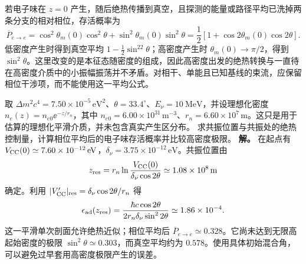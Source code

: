 若电子味在 $z=0$ 产生，随后绝热传播到真空，且探测的能量或路径平均已洗掉两条分支的相对相位，存活概率为
\begin{equation}
 \overline P_{e\to e}
 =\cos^2\theta_m(0)\cos^2\theta+\sin^2\theta_m(0)\sin^2\theta
 =\frac12[1+\cos2\theta_m(0)\cos2\theta].
 \label{eq:sm-matter-averaged-survival}
\end{equation}
低密度产生时得到真空平均 $1-\tfrac12\sin^22\theta$；高密度产生时 $\theta_m(0)\to\pi/2$，得到 $\sin^2\theta$。这里改变的是本征态随密度的组成，因此高密度出发的绝热转换与一直待在高密度介质中的小振幅振荡并不矛盾。对相干、单能且已知基线的束流，应保留相位干涉项，而不能使用这一平均公式。

\begin{exbox}[指数剖面的绝热性检查]
取 $\Delta m^2c^4=7.50\times10^{-5}\,\mathrm{eV^2}$、$\theta=33.4^\circ$、$E_\nu=\SI{10}{\mega\electronvolt}$，并设理想化密度 $n_e(z)=n_{e0}\ee^{-z/r_n}$，其中 $n_{e0}=6.00\times10^{31}\,\mathrm{m^{-3}}$、$r_n=6.60\times10^7\,\mathrm m$。这只是用于估算的理想化平滑介质，并未包含真实产生区分布。
求共振位置与共振处的绝热控制量，计算相位平均后的电子味存活概率并比较高密度极限。
\textbf{解。} 在起点有 $V_{\rm CC}(0)\simeq7.60\times10^{-12}\,\mathrm{eV}$，$\delta_\nu=3.75\times10^{-12}\,\mathrm{eV}$。共振位置由
\begin{equation*}
 z_{\rm res}=r_n\ln\frac{V_{\rm CC}(0)}{\delta_\nu\cos2\theta}
 \simeq1.08\times10^8\,\mathrm m
\end{equation*}
确定。利用 $|V_{\rm CC}'|_{\rm res}=\delta_\nu\cos2\theta/r_n$ 得
\begin{equation*}
 \epsilon_{\rm ad}(z_{\rm res})
 =\frac{\hbar c\cos2\theta}{2r_n\delta_\nu\sin^22\theta}
 \simeq1.86\times10^{-4}.
\end{equation*}
这一平滑单次剖面允许绝热近似；相位平均后 $\overline P_{e\to e}\simeq0.328$。它尚未达到无限高起始密度的极限 $\sin^2\theta\simeq0.303$，而真空平均约为 $0.578$。使用具体初始混合角，可以避免过早套用高密度极限产生的误差。
\end{exbox}

